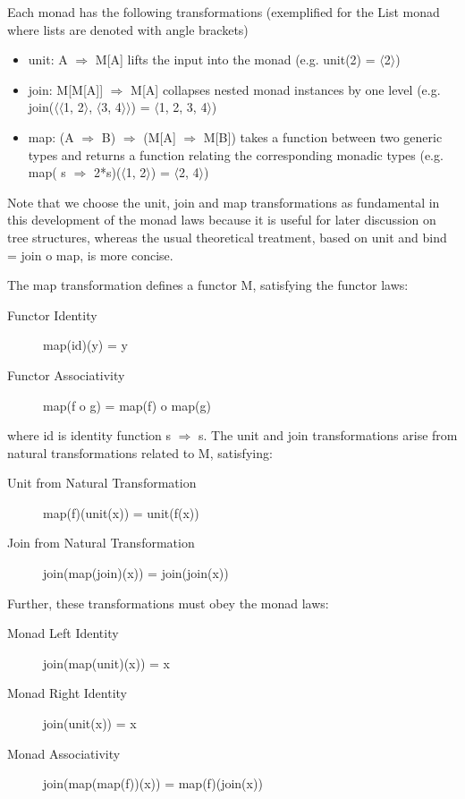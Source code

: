\documentclass[runningheads]{llncs}
\begin{document}
Each monad has the following transformations (exemplified for the List monad where lists are denoted with angle brackets)
\begin{itemize}
\item unit: A $\Rightarrow$ M[A] lifts the input into the monad (e.g. unit(2) = $\langle$2$\rangle$)
\item join: M[M[A]] $\Rightarrow$ M[A] collapses nested monad instances by one level (e.g. join($\langle$$\langle$1, 2$\rangle$, $\langle$3, 4$\rangle$$\rangle$) = $\langle$1, 2, 3, 4$\rangle$)
\item map: (A $\Rightarrow$ B) $\Rightarrow$ (M[A] $\Rightarrow$ M[B]) takes a function between two generic types and returns a function relating the corresponding monadic types (e.g. map( s $\Rightarrow$ 2*s)($\langle$1, 2$\rangle$) = $\langle$2, 4$\rangle$)
\end{itemize}
Note that we choose the unit, join and map transformations as fundamental in this development of the monad laws because it is useful for later discussion on tree structures, whereas the usual theoretical treatment, based on unit and bind = join o map, is more concise.

The map transformation defines a functor M, satisfying the functor laws:
\begin{description}
\item[Functor Identity] map(id)(y) = y
\item[Functor Associativity] map(f o g) = map(f) o map(g)
\end{description}
where id is identity function s $\Rightarrow$ s.
The unit and join transformations arise from natural transformations related to M, satisfying:
\begin{description}
\item[Unit from Natural Transformation] map(f)(unit(x)) = unit(f(x))
\item[Join from Natural Transformation] join(map(join)(x)) = join(join(x))
\end{description}

Further, these transformations must obey the monad laws:
\begin{description}
\item[Monad Left Identity] join(map(unit)(x)) = x
\item[Monad Right Identity] join(unit(x)) = x
\item[Monad Associativity] join(map(map(f))(x)) = map(f)(join(x))
\end{description}
\end{document}
